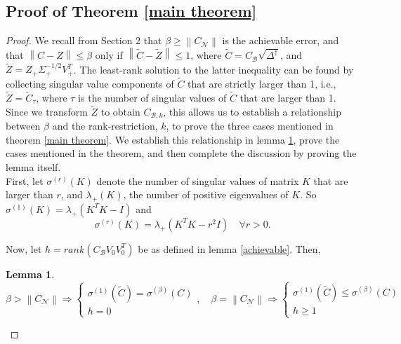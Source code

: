 \documentclass[11pt]{article}
\newtheorem{lemma}[theorem]{Lemma}
\newcommand{\norm}[1]{\left\|#1\right\|}
\newcommand{\B}{\mathcal{B}}
\newcommand{\N}{\mathcal{N}}
\newcommand{\0}{\ensuremath{\mathbf{0}}}
\renewcommand{\>}{\succ}
\newcommand{\<}{\prec}
\begin{document}
\subsection{Proof of Theorem \ref{main theorem}}
\begin{proof}
We recall from Section 2 that $\beta \geq \norm{C_{\N}}$ is the achievable error, and that $\norm{{C} - {Z}} \leq \beta$ only if $\norm{\tilde{C} - \tilde{Z}} \leq 1$, where $\tilde{C} = C_{\B} \sqrt{\Delta^{\dagger}}$, and $\tilde{Z} = Z_+{\Sigma}^{-1/2}_+V_+^T$. The least-rank solution to the latter inequality can be found by collecting singular value components of $\tilde{C}$ that are strictly larger than 1, i.e., $\tilde{Z} = \tilde{C}_{\tau}$, where $\tau$ is the number of singular values of $\tilde{C}$ that are larger than 1. Since we transform $\tilde Z$ to obtain $C_{\B, k}$, this allows us to establish a relationship between $\beta$ and the rank-restriction, $k$, to prove the three cases mentioned in theorem \ref{main theorem}. We establish this relationship in lemma \ref{lambda plus}, prove the cases mentioned in the theorem, and then complete the discussion by proving the lemma itself.\\  
\noindent First, let $ \sigma^{(r)}(K)$ denote the  number of singular values of matrix $K$ that are larger than $r$, and $\lambda_{+}(K)$, the number of positive eigenvalues of $K$.
So $\sigma^{(1)}(K) = \lambda_{+}(K^T K - I)$ and
\[ \sigma^{(r)}(K) =  \lambda_{+}( K^T K - r^2 I) \quad \forall r > 0. \]

Now, let $h  = rank(C_{\B} V_0 V_0 ^T)$ be as defined in lemma \ref{achievable}. Then, 
\begin{lemma}\label{lambda plus}
\[ \beta > \norm{C_{\N}} \Rightarrow \left\{ \begin{array}{l} \sigma^{(1)}(\tilde{C}) = \sigma^{(\beta)} (C) \\ h = 0 \end{array} \right. , \quad \beta = \norm{C_{\N}} \Rightarrow \left\{ \begin{array}{l} \sigma^{(1)}(\tilde{C}) \leq \sigma^{(\beta)} (C) \\ h \geq 1 \end{array} \right. \]
\end{lemma}


\end{proof}
\end{document}
